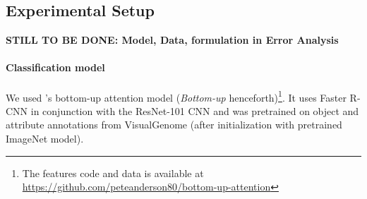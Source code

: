 

\subsection{Experimental Setup}
\textbf{STILL TO BE DONE: Model, Data, formulation in Error Analysis}
\paragraph{Classification model}
We used \citeauthor{anderson2018updown}'s \citeyear{anderson2018updown} bottom-up attention model (\textit{Bottom-up} henceforth)\footnote{The features code and data is available at \url{https://github.com/peteanderson80/bottom-up-attention}}. 
It uses Faster R-CNN in conjunction with the ResNet-101 CNN and was pretrained on object and attribute annotations from VisualGenome (after initialization with pretrained ImageNet model).
\iffalse
"To pretrain the bottom-up attention model, we first initialize Faster R-CNN with ResNet-101 pretrained for classification on ImageNet [35]. We then train on Visual
Genome [21] data. To aid the learning of good feature
representations, we add an additional training output for
predicting attribute classes (in addition to object classes).
To predict attributes for region i, we concatenate the mean
pooled convolutional feature vi with a learned embedding
of the ground-truth object class, and feed this into an additional output layer defining a softmax distribution over each
attribute class plus a ‘no attributes’ class.
The original Faster R-CNN multi-task loss function contains four components, defined over the classification and
bounding box regression outputs for both the RPN and the
final object class proposals respectively. We retain these
components and add an additional multi-class loss component to train the attribute predictor"
\fi

